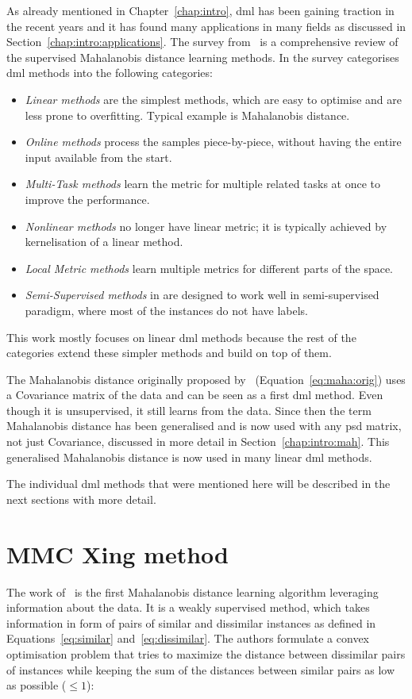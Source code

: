 \documentclass[12pt,a4paper]{report}
\begin{document}
As already mentioned in Chapter~\ref{chap:intro}, \ac{dml} has been gaining traction in the recent years and it has found many applications in many fields as discussed in Section~\ref{chap:intro:applications}. The survey from~\citep{bellet2013survey} is a comprehensive review of the supervised Mahalanobis distance learning methods. In the survey categorises \ac{dml} methods into the following categories: 
\begin{itemize}
\item \textit{Linear methods} are the simplest methods, which are easy to optimise and are less prone to overfitting. Typical example is Mahalanobis distance.
\item \textit{Online methods} process the samples piece-by-piece, without having the entire input available from the start.
\item \textit{Multi-Task methods} learn the metric for multiple related tasks at once to improve the performance.
\item \textit{Nonlinear methods} no longer have linear metric; it is typically achieved by kernelisation of a linear method.
\item \textit{Local Metric methods} learn multiple metrics for different parts of the space.
\item \textit{Semi-Supervised methods} in are designed to work well in semi-supervised paradigm, where most of the instances do not have labels.
\end{itemize}
This work mostly focuses on linear \ac{dml} methods because the rest of the categories extend these simpler methods and build on top of them.

The Mahalanobis distance originally proposed by~\citep{mahalanobis1936generalized} (Equation~\ref{eq:maha:orig}) uses a Covariance matrix of the data and can be seen as a first \ac{dml} method. Even though it is unsupervised, it still learns from the data. Since then the term Mahalanobis distance has been generalised and is now used with any \ac{psd} matrix, not just Covariance, discussed in more detail in Section~\ref{chap:intro:mah}. This generalised Mahalanobis distance is now used in many linear \ac{dml} methods.

The individual \ac{dml} methods that were mentioned here will be described in the next sections with more detail.

\section{MMC Xing method} \label{chap:rw:xing}
The work of~\citep{xing2002distance} is the first Mahalanobis distance learning algorithm leveraging information about the data. It is a weakly supervised method, which takes information in form of pairs of similar and dissimilar instances as defined in Equations~\ref{eq:similar} and~\ref{eq:dissimilar}. The authors formulate a convex optimisation problem that tries to maximize the distance between dissimilar pairs of instances while keeping the sum of the distances between similar pairs as low as possible ($\leq 1$):
\end{document}
